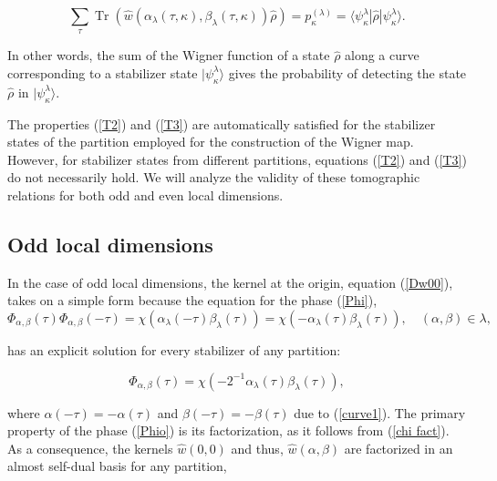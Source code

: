 \documentclass[quantumrep,article,submit,pdftex,moreauthors]{Definitions/mdpi}
\DeclareMathOperator{\Tr}{Tr}
\begin{document}
\begin{equation}
  \sum_{\tau } \Tr\left(
    \hat{w}\left(
      \alpha_{\lambda}(\tau,\kappa),\beta_{\lambda}(\tau,\kappa)
    \right)
    \hat{\rho}
  \right)
  = p_{\kappa}^{(\lambda)} = \langle \psi_{\kappa}^{\lambda}
  |\hat{\rho}|\psi_{\kappa}^{\lambda}\rangle.
  \label{T3}
\end{equation}

In other words, the sum of the Wigner function of a state $\hat{\rho}$ along a
curve corresponding to a stabilizer state $|\psi _{\kappa }^{\lambda }\rangle$
gives the probability of detecting the state $\hat{\rho}$ in $|\psi_{\kappa
}^{\lambda}\rangle$.

The properties (\ref{T2}) and (\ref{T3}) are automatically satisfied for the
stabilizer states of the partition employed for the construction of the Wigner
map. However, for stabilizer states from different partitions, equations
(\ref{T2}) and (\ref{T3}) do not necessarily hold. We will analyze the validity
of these tomographic relations for both odd and even local dimensions.

\subsection{Odd local dimensions}

In the case of odd local dimensions, the kernel at the origin, equation
(\ref{Dw00}), takes on a simple form because the equation for the phase
(\ref{Phi}),
\begin{equation*}
  \Phi_{\alpha,\beta} (\tau) \Phi_{\alpha,\beta}(-\tau)
  = \chi\left(\alpha_{\lambda}(-\tau)\beta_{\lambda}(\tau)\right)
  = \chi\left(-\alpha_{\lambda}(\tau)\beta_{\lambda}(\tau)\right),
  \quad (\alpha,\beta) \in \lambda,
\end{equation*}

has an explicit solution for every stabilizer of any partition:%

\begin{equation}
  \Phi_{\alpha,\beta}(\tau)
  = \chi\left(
    -2^{-1}\alpha_{\lambda }(\tau) \beta_{\lambda }(\tau)
  \right),
  \label{Phio}
\end{equation}

where $\alpha(-\tau) = -\alpha(\tau)$ and $\beta(-\tau) = -\beta(\tau)$
due to (\ref{curve1}). The primary property of the phase (\ref{Phio}) is its
factorization, as it follows from (\ref{chi fact}). As a consequence, the
kernels $\hat{w}\left(0,0\right)$ and thus, $\hat{w}\left(\alpha,\beta\right)$
are factorized in an almost self-dual basis for any partition,
\end{document}
